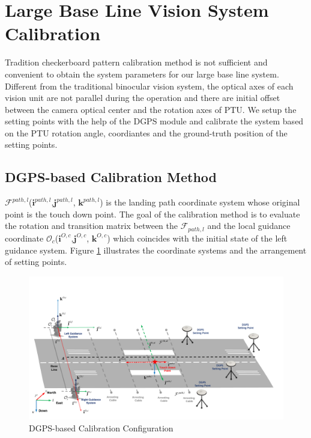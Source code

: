 \documentclass[journal,article,submit,moreauthors,pdftex,10pt,a4paper]{mdpi}
\begin{document}
\section{Large Base Line Vision System Calibration}
Tradition checkerboard pattern calibration method is not sufficient and convenient to obtain the system parameters for our large base line system. Different from the traditional binocular vision system, the optical axes of each vision unit are not parallel during the operation and there are initial offset between the camera optical center and the rotation axes of PTU. We setup the setting points with the help of the DGPS module and calibrate the system based on the PTU rotation angle, coordiantes and the ground-truth position of the setting points.
\subsection{DGPS-based Calibration Method}
$\mathcal{F}^{path,l}$($\mathbf{i}^{path,l}$,$\mathbf{j}^{path,l}$, $\mathbf{k}^{path,l}$) is the landing path coordinate system whose original point is the touch down point. The goal of the calibration method is to evaluate the rotation and transition matrix between the $\mathcal{F}_{path,l}$ and the local guidance coordinate $\mathcal{O}_c$($\mathbf{i}^{O,c}$,$\mathbf{j}^{O,c}$, $\mathbf{k}^{O,c}$) which coincides with the initial state of the left guidance system. Figure \ref{fig:10_DGPS_Calibration} illustrates the coordinate systems and the arrangement of setting points.

\begin{figure}[!ht]
	\centering
	\includegraphics[width=\textwidth]{Figs/10_DGPS_Calibration.pdf}	
	\caption{DGPS-based Calibration Configuration}
	\label{fig:10_DGPS_Calibration}
\end{figure}
\end{document}
